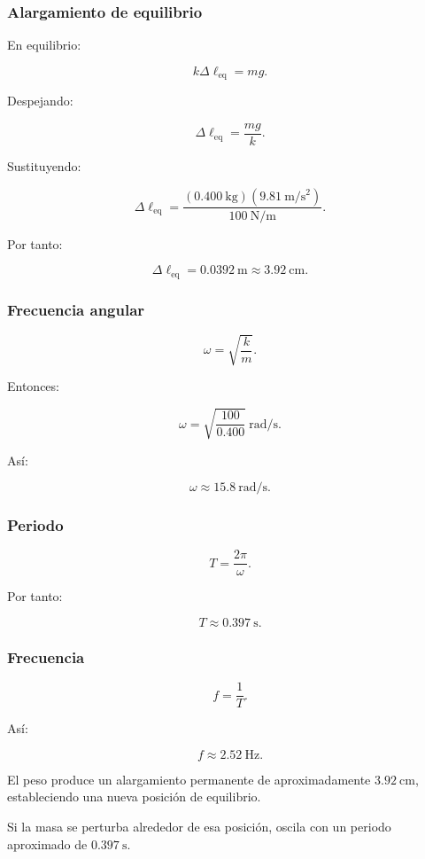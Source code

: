 \subsubsection*{Alargamiento de equilibrio}

En equilibrio:

\[ k\Delta\ell_{\mathrm{eq}}=mg. \]

Despejando:

\[ \Delta\ell_{\mathrm{eq}}=\frac{mg}{k}. \]

Sustituyendo:

\[
\Delta\ell_{\mathrm{eq}}
=
\frac{
(\SI{0.400}{\kilogram})
(\SI{9.81}{\meter\per\second\squared})
}{
\SI{100}{\newton\per\meter}
}.
\]

Por tanto:

\[ \boxed{\Delta\ell_{\mathrm{eq}}=\SI{0.0392}{\meter}\approx\SI{3.92}{\centi\meter}}. \]

\subsubsection*{Frecuencia angular}

\[ \omega=\sqrt{\frac{k}{m}}. \]

Entonces:

\[
\omega
=
\sqrt{
\frac{100}{0.400}
}\ \si{\radian\per\second}.
\]

Así:

\[ \boxed{\omega\approx\SI{15.8}{\radian\per\second}}. \]

\subsubsection*{Periodo}

\[ T=\frac{2\pi}{\omega}. \]

Por tanto:

\[ \boxed{T\approx\SI{0.397}{\second}}. \]

\subsubsection*{Frecuencia}

\[ f=\frac{1}{T}. \]

Así:

\[ \boxed{f\approx\SI{2.52}{\hertz}}. \]

\begin{interpretacion}
El peso produce un alargamiento permanente de aproximadamente \(\SI{3.92}{\centi\meter}\), estableciendo una nueva posición de equilibrio.

Si la masa se perturba alrededor de esa posición, oscila con un periodo aproximado de \(\SI{0.397}{\second}\).
\end{interpretacion}


